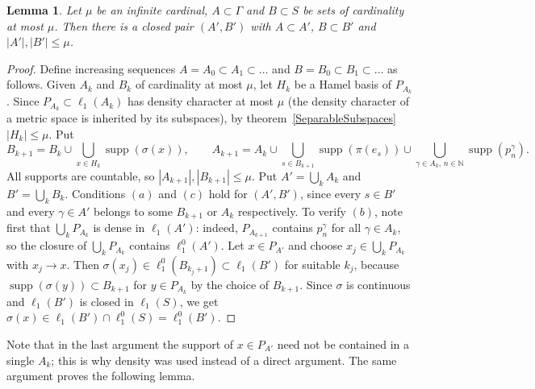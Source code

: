 \documentclass[12pt]{article}
\newtheorem{lemma}[theorem]{Lemma}
\newcommand{\lo}[1]{\ell_1^0(#1)}
\newcommand{\ellone}[1]{\ell_1(#1)}
\newcommand{\supp}{\operatorname{supp}}
\begin{document}
\begin{lemma}\label{ClosingOff} Let $\mu$ be an infinite cardinal,
    $A\subset\Gamma$ and $B\subset S$ be sets of cardinality at most $\mu$.
    Then there is a closed pair $(A',B')$ with $A\subset A'$, $B\subset B'$ and
    $|A'|,|B'|\leq\mu$.
\end{lemma}
\begin{proof} Define increasing sequences $A=A_0\subset A_1\subset\ldots$ and
    $B=B_0\subset B_1\subset\ldots$ as follows. Given $A_k$ and $B_k$ of
    cardinality at most $\mu$, let $H_k$ be a Hamel basis of $P_{A_k}$. Since
    $P_{A_k}\subset\ellone{A_k}$ has density character at most $\mu$ (the
    density character of a metric space is inherited by its subspaces), by
    theorem~\ref{SeparableSubspaces} $|H_k|\leq\mu$. Put
    \[
    B_{k+1}=B_k\cup\bigcup_{x\in H_k}\supp(\sigma(x)),\qquad
    A_{k+1}=A_k\cup\bigcup_{s\in B_{k+1}}\supp(\pi(e_s))
    \cup\bigcup_{\gamma\in A_k,\,n\in\mathbb{N}}\supp(p^\gamma_n).
    \]
    All supports are countable, so $|A_{k+1}|,|B_{k+1}|\leq\mu$. Put
    $A'=\bigcup_k A_k$ and $B'=\bigcup_k B_k$. Conditions $(a)$ and $(c)$ hold
    for $(A',B')$, since every $s\in B'$ and every $\gamma\in A'$ belongs to
    some $B_{k+1}$ or $A_k$ respectively. To verify $(b)$, note first that
    $\bigcup_k P_{A_k}$ is dense in $\ellone{A'}$: indeed, $P_{A_{k+1}}$
    contains $p^\gamma_n$ for all $\gamma\in A_k$, so the closure of
    $\bigcup_k P_{A_k}$ contains $\lo{A'}$. Let $x\in P_{A'}$ and choose
    $x_j\in\bigcup_k P_{A_k}$ with $x_j\to x$. Then $\sigma(x_j)\in\lo{B_{k_j+1}}
    \subset\ellone{B'}$ for suitable $k_j$, because $\supp(\sigma(y))\subset
    B_{k+1}$ for $y\in P_{A_k}$ by the choice of $B_{k+1}$. Since $\sigma$ is
    continuous and $\ellone{B'}$ is closed in $\ellone{S}$, we get
    $\sigma(x)\in\ellone{B'}\cap\lo{S}=\lo{B'}$.
\end{proof}

Note that in the last argument the support of $x\in P_{A'}$ need not be
contained in a single $A_k$; this is why density was used instead of a
direct argument. The same argument proves the following lemma.
\end{document}
